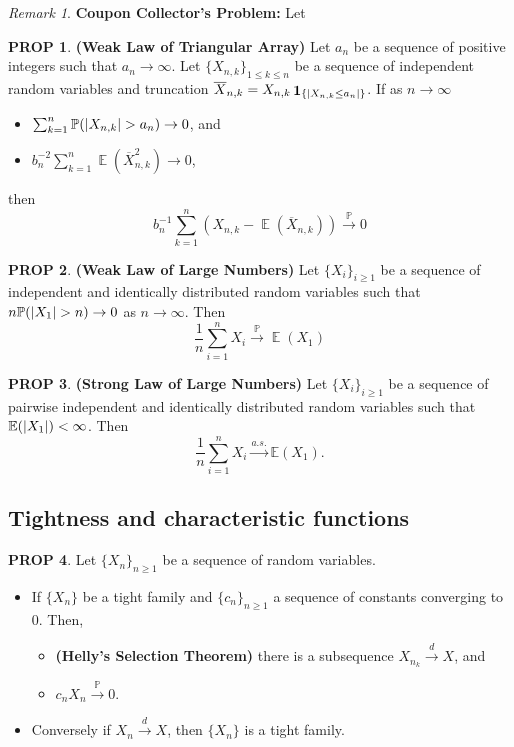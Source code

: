 \documentclass[hidelinks,11pt]{article}
\theoremstyle{definition}
\theoremstyle{dotless}
\newtheorem{prop}{PROP}[section]
\theoremstyle{remark}
\newtheorem*{remark}{Remark}
\DeclareMathOperator{\E}{\mathbb{E}}
\DeclareMathOperator{\1}{\mathbf{1}}
\begin{document}
\begin{remark}\textup{\textbf{Coupon Collector's Problem:}} Let
\end{remark}

\begin{prop}\textup{\textbf{(Weak Law of Triangular Array) }}Let $a_n$ be a sequence of positive integers such that $a_n\to\infty$. Let $\{X_{n,k}\}_{1\leq k\leq n}$ be a sequence of independent random variables and truncation $\overline{X}_{n,k}=X_{n,k}\1_{\{\abs{X_{n,k}\leq a_n}\}}$. If as $n\to\infty$\begin{itemize}
    \item $\sum_{k=1}^n\mathbb{P}(\abs{X_{n,k}}>a_n)\to0$, and
    \item $b_n^{-2}\sum_{k=1}^n\E(\overline{X}_{n,k}^2)\to0$,
\end{itemize}
then
\[b_n^{-1}\sum_{k=1}^n(X_{n,k}-\E(\overline{X}_{n,k}))\xrightarrow{\mathbb{P}}0\]
\end{prop}

\begin{prop}\textup{\textbf{(Weak Law of Large Numbers) }}Let $\{X_i\}_{i\geq1}$ be a sequence of independent and identically distributed random variables such that $n\mathbb{P}(\abs{X_1}>n)\to0$ as $n\to\infty$. Then
\[\frac{1}{n}\sum_{i=1}^n X_i\xrightarrow{\mathbb{P}}\E(X_1)\]
\end{prop}

\begin{prop}\textup{\textbf{(Strong Law of Large Numbers) }}Let $\{X_i\}_{i\geq1}$ be a sequence of pairwise independent and identically distributed random variables such that $\mathbb{E}(\abs{X_1})<\infty$. Then
\[\frac{1}{n}\sum_{i=1}^nX_i\xrightarrow{a.s.}\mathbb{E}(X_1).\]
\end{prop}

\subsection{Tightness and characteristic functions}

\begin{prop}
Let $\{X_n\}_{n\geq1}$ be a sequence of random variables.
\begin{itemize}
\item If $\{X_n\}$ be a tight family and $\{c_n\}_{n\geq1}$ a sequence of constants converging to 0. Then,\begin{itemize}
    \item \textup{\textbf{(Helly's Selection Theorem)}} there is a subsequence $X_{n_k}\xrightarrow{d}X$, and
    \item $c_nX_n\xrightarrow{\mathbb{P}}0$.
\end{itemize}
\item Conversely if $X_n\xrightarrow{d}X$, then $\{X_n\}$ is a tight family.
\end{itemize}
\end{prop}
\end{document}
